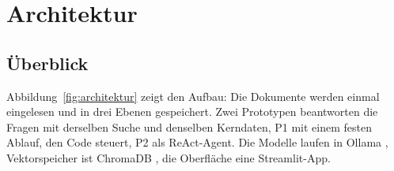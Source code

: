 
\chapter{Architektur}
\label{chap:architektur}

\section{Überblick}

Abbildung~\ref{fig:architektur} zeigt den Aufbau: Die Dokumente werden einmal eingelesen und in drei Ebenen gespeichert. Zwei Prototypen beantworten die Fragen mit derselben Suche und denselben Kerndaten, P1 mit einem festen Ablauf, den Code steuert, P2 als ReAct-Agent. Die Modelle laufen in Ollama \cite{ollama}, Vektorspeicher ist ChromaDB \cite{chromadb}, die Oberfläche eine Streamlit-App.

